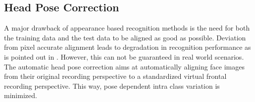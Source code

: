 \subsection{Head Pose Correction}
\label{chap:methods:subsec:pose}
A major drawback of appearance based recognition methods is the need for both the training data and 
the test data to be aligned as good as possible.
Deviation from pixel accurate alignment leads to degradation in recognition performance as is pointed out in \cite{Wagner2012}.
However, this can not be guaranteed in real world scenarios.
The automatic head pose correction aims at automatically aligning face images from their original recording perspective to a standardized virtual frontal recording perspective. %
This way, pose dependent intra class variation is minimized. %

%    

